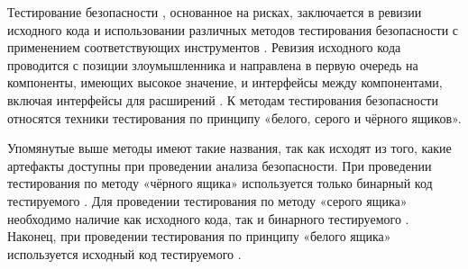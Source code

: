 %
Тестирование безопасности , основанное на рисках, заключается в ревизии исходного кода и использовании различных методов тестирования безопасности с применением соответствующих инструментов . 
%
Ревизия исходного кода проводится с позиции злоумышленника и направлена в первую очередь на компоненты, имеющих высокое значение, и интерфейсы между компонентами, включая интерфейсы для расширений . 
%
К методам тестирования безопасности относятся техники тестирования по принципу «белого, серого и чёрного ящиков».

%
Упомянутые выше методы имеют такие названия, так как исходят из того, какие артефакты  доступны при проведении анализа безопасности. 
%
При проведении тестирования  по методу «чёрного ящика» используется только бинарный код тестируемого . 
%
Для проведении тестирования  по методу «серого ящика» необходимо наличие как исходного кода, так и бинарного тестируемого . 
%
Наконец, при проведении тестирования  по принципу «белого ящика» используется исходный код тестируемого .